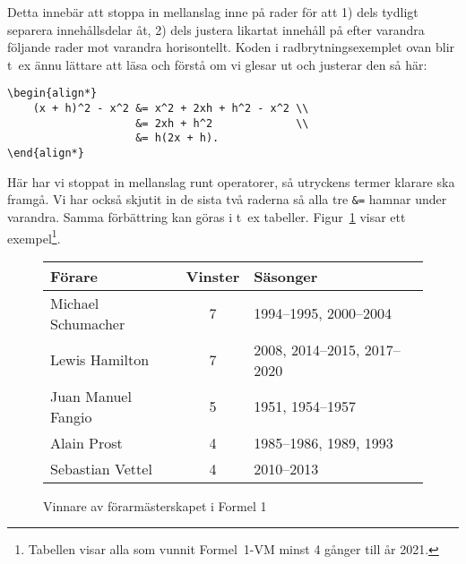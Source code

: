 \documentclass[a4paper,12pt]{article}
\begin{document}
Detta innebär att stoppa in mellanslag inne på rader för att 
1) dels tydligt separera innehållsdelar åt,
2) dels justera likartat innehåll på efter varandra följande
   rader mot varandra horisontellt. 
Koden i radbrytningsexemplet ovan blir t~ex ännu lättare att
läsa och förstå om vi glesar ut och justerar den så här:
%
\begin{verbatim}
\begin{align*}
    (x + h)^2 - x^2 &= x^2 + 2xh + h^2 - x^2 \\
                    &= 2xh + h^2             \\
                    &= h(2x + h).
\end{align*}
\end{verbatim}
%
Här har vi stoppat in mellanslag runt operatorer, så utryckens
termer klarare ska framgå. Vi har också skjutit in de sista
två raderna så alla tre \verb!&=! hamnar under varandra. Samma
förbättring kan göras i t~ex tabeller. Figur~\ref{fig:f1} visar ett
exempel\footnote{Tabellen visar alla som vunnit Formel~1-VM minst 4
gånger till år 2021.}.
%
\begin{figure}[h]
    \centering
    \begin{tabular}{|l|c|l|}
        \hline \hline
        Förare & Vinster & Säsonger \\
        \hline \hline      
        Michael Schumacher & 7 & 1994--1995, 2000--2004 \\
        \hline
        Lewis Hamilton & 7 & 2008, 2014--2015, 2017--2020 \\
        \hline
        Juan Manuel Fangio & 5 & 1951, 1954--1957 \\
        \hline
        Alain Prost & 4 & 1985--1986, 1989, 1993 \\
        \hline
        Sebastian Vettel & 4 & 2010--2013 \\ 
        \hline \hline
    \end{tabular}
    \caption{Vinnare av förarmästerskapet i Formel 1}
    \label{fig:f1}
\end{figure}
\end{document}
